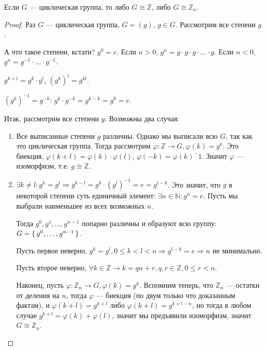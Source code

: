 \begin{Th}
  Если $G$ --- циклическая группа, то либо $G \cong \mathbb{Z}$, либо $G \cong \mathbb{Z}_n$.
  \begin{proof}
	Раз $G$ --- циклическая группа, $G = (g)$, $g \in G$. Рассмотрим все степени $g$. 

	А что такое степени, кстати? $g^0 = e$. Если $n > 0$, $g^n = g \cdot g \cdot g \cdot \ldots \cdot g$.
	Если $n < 0$, $g^n = g^{-1} \cdot \ldots \cdot g^{-1}$.

	\begin{exercise}
	  $g^{k+l} = g^k \cdot g^l$, $(g^k)^l = g^{kl}$.
	\end{exercise}

	\begin{claim}[Следствие]
	  $(g^k)^{-1} = g^{-k}$: $g^k \cdot g^{-k} = g^{k-k} = g^0 = e$.
	\end{claim}

	Итак, рассмотрим все степени $g$. Возможны два случая:
	\begin{enumerate}
	  \item Все выписанные степени $g$ различны. Однако мы выписали всю $G$, так как это циклическая группа. 
		Тогда рассмотрим $\varphi: \mathbb{Z} \to G, \varphi(k) = g^k$. 
		Это биекция, $\varphi(k+l)=\varphi(k)\cdot\varphi(l)$, $\varphi(-k)=\varphi(k)^-1$.
		Значит $\varphi$ --- изоморфизм, т.е. $g \cong \mathbb{Z}$.

	  \item $\exists k \neq l : g^k = g^l  \Rightarrow g^{k-l} = g^k\cdot (g^l)^{-1} = e = g^{l-k}$. Это значит, что $g$ в некоторой степени 
		суть единичный элемент: $\exists n \in \mathbb{N} : g^n = e$. Пусть мы выбрали наименьшее из всех возможных $n$.

		Тогда $g^0, g^1, \ldots, g^{n-1}$ попарно различны и образуют всю группу: $G = \set{g^0, \ldots, g^{n-1}}$.

		Пусть первое неверно, $g^k = g^l, 0 \le k < l < n \Rightarrow g^{l-k} = e \Rightarrow n$ не минимально.

		Пусть второе неверно, $\forall k \in \mathbb{Z} \to k = qn + r, q, r \in \mathbb{Z}, 0 \le r < n$.

		Наконец, пусть $\varphi: \mathbb{Z}_n \to G, \varphi(k) = g^k$. Вспомним теперь, что $\mathbb{Z}_n$ --- остатки от деления на $n$,
		тогда $\varphi$ --- биекция (по двум только что доказанным фактам), и $\varphi(k + l) = g^{k+l}$ либо $\varphi(k+l) = g^{k+l-n}$,
		но тогда в любом случае $g^{k+l} = \varphi(k) + \varphi(l)$, значит мы предъявили изоморфизм, значит $G \cong \mathbb{Z}_n$.
	\end{enumerate}
  \end{proof}
\end{Th}

